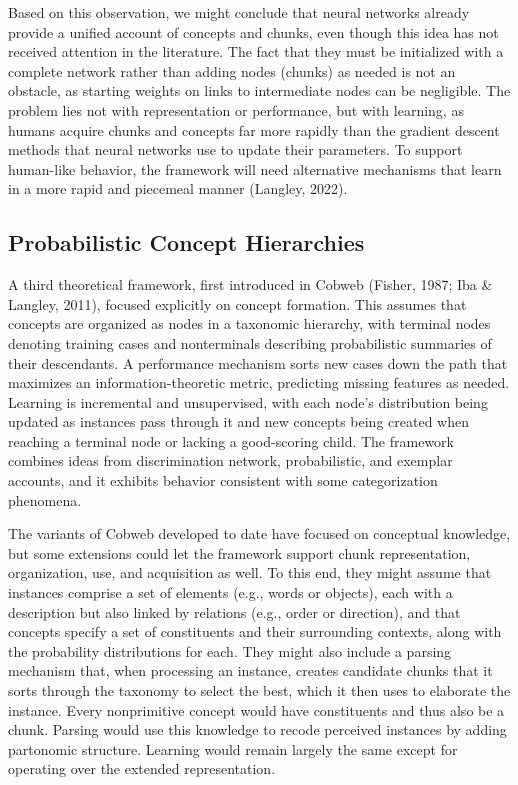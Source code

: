 \documentclass[11pt,letterpaper]{article}
\begin{document}
Based on this observation, we might conclude that neural networks
already provide a unified account of concepts and chunks, even
though this idea has not received attention in the literature.
The fact that they must be initialized with a complete network
rather than adding nodes (chunks) as needed is not an obstacle, as 
starting weights on links to intermediate nodes can be negligible.
The problem lies not with representation or performance, but with 
learning, as humans acquire chunks and concepts far more rapidly
than the gradient descent methods that neural networks use to
update their parameters. To support human-like behavior, the
framework will need alternative mechanisms that learn in a more
rapid and piecemeal manner (Langley, 2022). 

\vspace{-0.05in}
\subsection{Probabilistic Concept Hierarchies}
\vspace{-0.01in}

A third theoretical framework, first introduced in Cobweb (Fisher,
1987; Iba \& Langley, 2011), focused explicitly on concept 
formation. This assumes that concepts are organized as nodes in a 
taxonomic hierarchy, with terminal nodes denoting training cases
and nonterminals describing probabilistic summaries of their
descendants. A performance mechanism sorts new cases down the path
that maximizes an information-theoretic metric, predicting missing
features as needed. Learning is incremental and unsupervised,
with each node's distribution being updated as instances pass 
through it and new concepts being created when reaching a terminal 
node or lacking a good-scoring child. The framework combines ideas 
from discrimination network, probabilistic, and exemplar accounts, 
and it exhibits behavior consistent with some categorization phenomena.

The variants of Cobweb developed to date have focused on conceptual
knowledge, but some extensions could let the framework support chunk
representation, organization, use, and acquisition as well. To this
end, they might assume that instances comprise a set of elements
(e.g., words or objects), each with a description but also linked
by relations (e.g., order or direction), and that concepts specify 
a set of constituents and their surrounding contexts, along with the
probability distributions for each. They might also include a parsing
mechanism that, when processing an instance, creates candidate chunks
that it sorts through the taxonomy to select the best, which it then
uses to elaborate the instance. Every nonprimitive concept would have
constituents and thus also be a chunk. Parsing would use this knowledge
to recode perceived instances by adding partonomic structure. Learning
would remain largely the same except for operating over the extended 
representation.
\end{document}

